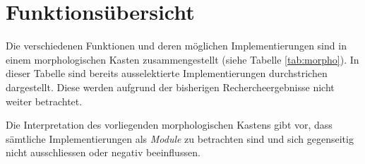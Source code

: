 \section{Funktionsübersicht}
Die verschiedenen Funktionen und deren möglichen Implementierungen sind in
einem morphologischen Kasten zusammengestellt (siehe Tabelle 
\ref{tab:morpho}). In dieser Tabelle sind bereits ausselektierte 
Implementierungen durchstrichen dargestellt. Diese werden aufgrund der
bisherigen Rechercheergebnisse nicht weiter betrachtet.

Die Interpretation des vorliegenden morphologischen Kastens gibt vor, dass
sämtliche Implementierungen als \emph{Module} zu betrachten sind und sich
gegenseitig nicht ausschliessen oder negativ beeinflussen.





















